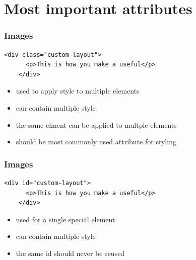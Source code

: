\documentclass{beamer}
\begin{document}
\section[Section]{Most important attributes}

\begin{frame}[fragile]
  \frametitle{Images}
  \begin{lstlisting}[basicstyle=\footnotesize]
    <div class="custom-layout">
      <p>This is how you make a useful</p>
    </div>
  \end{lstlisting}
  \begin{itemize}
    \item used to apply style to multiple elements
    \item can contain multiple style
    \item the same elment can be applied to multple elements
    \item should be most commonly used attribute for styling
  \end{itemize}
\end{frame}

\begin{frame}[fragile]
  \frametitle{Images}
  \begin{lstlisting}[basicstyle=\footnotesize]
    <div id="custom-layout">
      <p>This is how you make a useful</p>
    </div>
  \end{lstlisting}
  \begin{itemize}
    \item used for a single special element
    \item can contain multiple style
    \item the same id should never be reused
  \end{itemize}
\end{frame}
\end{document}
